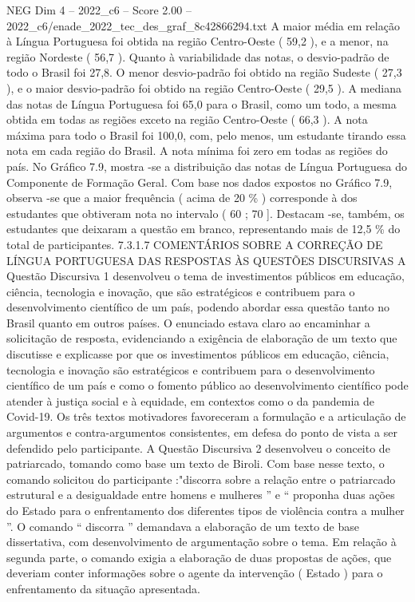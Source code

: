 \begin{textsample}{NEG Dim 4 – 2022\_c6 – Score 2.00 – 2022\_c6/enade\_2022\_tec\_des\_graf\_8c42866294.txt}
A maior média em relação à Língua Portuguesa foi obtida na região Centro-Oeste ( 59,2 ), e a menor, na região Nordeste ( 56,7 ).
Quanto à variabilidade das notas, o desvio-padrão de todo o Brasil foi 27,8.
O menor desvio-padrão foi obtido na região Sudeste ( 27,3 ), e o maior desvio-padrão foi obtido na região Centro-Oeste ( 29,5 ).
A mediana das notas de Língua Portuguesa foi 65,0 para o Brasil, como um todo, a mesma obtida em todas as regiões exceto na região Centro-Oeste ( 66,3 ).
A nota máxima para todo o Brasil foi 100,0, com, pelo menos, um estudante tirando essa nota em cada região do Brasil.
A nota mínima foi zero em todas as regiões do país.
No Gráfico 7.9, mostra -se a distribuição das notas de Língua Portuguesa do Componente de Formação Geral.
Com base nos dados expostos no Gráfico 7.9, observa -se que a maior frequência ( acima de 20 \% ) corresponde à dos estudantes que obtiveram nota no intervalo ( 60 ; 70 ].
Destacam -se, também, os estudantes que deixaram a questão em branco, representando mais de 12,5 \% do total de participantes. 7.3.1.7 COMENTÁRIOS SOBRE A CORREÇÃO DE LÍNGUA PORTUGUESA DAS RESPOSTAS ÀS QUESTÕES DISCURSIVAS A Questão Discursiva 1 desenvolveu o tema de investimentos públicos em educação, ciência, tecnologia e inovação, que são estratégicos e contribuem para o desenvolvimento científico de um país, podendo abordar essa questão tanto no Brasil quanto em outros países.
O enunciado estava claro ao encaminhar a solicitação de resposta, evidenciando a exigência de elaboração de um texto que discutisse e explicasse por que os investimentos públicos em educação, ciência, tecnologia e inovação são estratégicos e contribuem para o desenvolvimento científico de um país e como o fomento público ao desenvolvimento científico pode atender à justiça social e à equidade, em contextos como o da pandemia de Covid-19.
Os três textos motivadores favoreceram a formulação e a articulação de argumentos e contra-argumentos consistentes, em defesa do ponto de vista a ser defendido pelo participante.
A Questão Discursiva 2 desenvolveu o conceito de patriarcado, tomando como base um texto de Biroli.
Com base nesse texto, o comando solicitou do participante :"discorra sobre a relação entre o patriarcado estrutural e a desigualdade entre homens e mulheres ” e “ proponha duas ações do Estado para o enfrentamento dos diferentes tipos de violência contra a mulher ”.
O comando “ discorra ” demandava a elaboração de um texto de base dissertativa, com desenvolvimento de argumentação sobre o tema.
Em relação à segunda parte, o comando exigia a elaboração de duas propostas de ações, que deveriam conter informações sobre o agente da intervenção ( Estado ) para o enfrentamento da situação apresentada.

\end{textsample}
